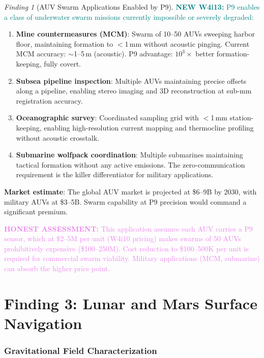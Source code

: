 \documentclass[11pt]{article}
\theoremstyle{definition}
\theoremstyle{remark}
\newtheorem{finding}[theorem]{Finding}
\newcommand{\honest}[1]{\textcolor{violet}{\textbf{HONEST ASSESSMENT:} #1}}
\newcommand{\newfinding}[1]{\textcolor{teal}{\textbf{NEW W4i13:} #1}}
\begin{document}
\begin{finding}[AUV Swarm Applications Enabled by P9]
\label{find:auv-apps}
\newfinding{P9 enables a class of underwater swarm missions currently
impossible or severely degraded:}
\begin{enumerate}[nosep]
\item \textbf{Mine countermeasures (MCM)}: Swarm of 10--50 AUVs sweeping
  harbor floor, maintaining formation to $<$1\,mm without acoustic pinging.
  Current MCM accuracy: $\sim$1--5\,m (acoustic). P9 advantage: $10^3\times$
  better formation-keeping, fully covert.
\item \textbf{Subsea pipeline inspection}: Multiple AUVs maintaining precise
  offsets along a pipeline, enabling stereo imaging and 3D reconstruction
  at sub-mm registration accuracy.
\item \textbf{Oceanographic survey}: Coordinated sampling grid with
  $<$1\,mm station-keeping, enabling high-resolution current mapping
  and thermocline profiling without acoustic crosstalk.
\item \textbf{Submarine wolfpack coordination}: Multiple submarines
  maintaining tactical formation without any active emissions. The
  zero-communication requirement is the killer differentiator for
  military applications.
\end{enumerate}

\textbf{Market estimate}: The global AUV market is projected at \$6--9B
by 2030, with military AUVs at \$3--5B. Swarm capability at P9 precision
would command a significant premium.
\end{finding}

\honest{This application assumes each AUV carries a P9 sensor, which at
\$2--5M per unit (W4i10 pricing) makes swarms of 50 AUVs prohibitively
expensive (\$100--250M). Cost reduction to \$100--500K per unit is
required for commercial swarm viability. Military applications (MCM,
submarine) can absorb the higher price point.}

\part{Finding 3: Lunar and Mars Surface Navigation}
\label{part:lunar-mars}

\section{Gravitational Field Characterization}
\label{sec:planetary-grav}
\end{document}
